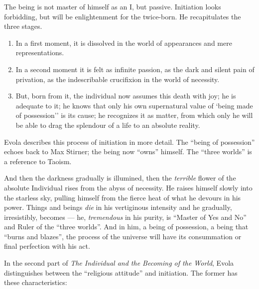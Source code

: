 The being is not master of himself as an I, but passive. Initiation looks forbidding, but will be enlightenment for the twice-born. He recapitulates the three stages.

\begin{enumerate}


\item In a first moment, it is dissolved in the world of appearances and mere representations.

\item In a second moment it is felt as infinite passion, as the dark and silent pain of privation, as the indescribable crucifixion in the world of necessity.

\item But, born from it, the individual now assumes this death with joy; he is adequate to it; he knows that only his own supernatural value of `being made of possession'' is its cause; he recognizes it as matter, from which only he will be able to drag the splendour of a life to an absolute reality.
\end{enumerate}


Evola describes this process of initiation in more detail. The ``being of possession'' echoes back to Max Stirner; the being now ``owns'' himself. The ``three worlds'' is a reference to Taoism.

\begin{quotex}
And then the darkness gradually is illumined, then the \emph{terrible} flower of the absolute Individual rises from the abyss of necessity. He raises himself slowly into the starless sky, pulling himself from the fierce heat of what he devours in his power. Things and beings \emph{die} in his vertiginous intensity and he gradually, irresistibly, becomes --- he, \emph{tremendous} in his purity, is ``Master of Yes and No'' and Ruler of the ``three worlds''. And in him, a being of possession, a being that ``burns and blazes'', the process of the universe will have its consummation or final perfection with his act.
\end{quotex}


In the second part of \emph{The Individual and the Becoming of the World}, Evola distinguishes between the ``religious attitude'' and initiation. The former has these characteristics:

